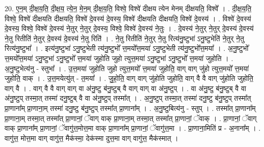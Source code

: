 \documentclass[17pt]{extarticle}
\begin{document}
20. ए॒न॒म् दी॒क्ष॒य॒ति॒ दी॒क्ष॒य॒ त्ये॒न॒ मे॒न॒म् दी॒क्ष॒य॒ति॒ विश्वे॒ विश्वे॑ दीक्षय त्येन मेनम् दीक्षयति॒ विश्वे᳚ । . दी॒क्ष॒य॒ति॒ विश्वे॒ विश्वे॑ दीक्षयति दीक्षयति॒ विश्वे॑ दे॒वस्य॑ दे॒वस्य॒ विश्वे॑ दीक्षयति दीक्षयति॒ विश्वे॑ दे॒वस्य॑ । . विश्वे॑ दे॒वस्य॑ दे॒वस्य॒ विश्वे॒ विश्वे॑ दे॒वस्य॑ ने॒तुर् ने॒तुर् दे॒वस्य॒ विश्वे॒ विश्वे॑ दे॒वस्य॑ ने॒तुः । . दे॒वस्य॑ ने॒तुर् ने॒तुर् दे॒वस्य॑ दे॒वस्य॑ ने॒तु रितीति॑ ने॒तुर् दे॒वस्य॑ दे॒वस्य॑ ने॒तु रिति॑ । . ने॒तु रितीति॑ ने॒तुर् ने॒तु रित्य॑नु॒ष्टुभा॑ ऽनु॒ष्टुभेति॑ ने॒तुर् ने॒तु रित्य॑नु॒ष्टुभा᳚ । . इत्य॑नु॒ष्टुभा॑ ऽनु॒ष्टुभेती त्य॑नु॒ष्टुभो᳚ त्त॒मयो᳚त्त॒मया॑ ऽनु॒ष्टुभेती त्य॑नु॒ष्टुभो᳚त्त॒मया᳚ । . अ॒नु॒ष्टुभो᳚ त्त॒मयो᳚त्त॒मया॑ ऽनु॒ष्टुभा॑ ऽनु॒ष्टुभो᳚ त्त॒मया॑ जुहोति जुहो त्युत्त॒मया॑ ऽनु॒ष्टुभा॑ ऽनु॒ष्टुभो᳚ त्त॒मया॑ जुहोति । . अ॒नु॒ष्टुभेत्य॑नु - स्तुभा᳚ । . उ॒त्त॒मया॑ जुहोति जुहो त्युत्त॒मयो᳚ त्त॒मया॑ जुहोति॒ वाग् वाग् जु॑हो त्युत्त॒मयो᳚ त्त॒मया॑ जुहोति॒ वाक् । . उ॒त्त॒मयेत्यु॑त् - त॒मया᳚ । . जु॒हो॒ति॒ वाग् वाग् जु॑होति जुहोति॒ वाग् वै वै वाग् जु॑होति जुहोति॒ वाग् वै । . वाग् वै वै वाग् वाग् वा अ॑नु॒ष्टु ब॑नु॒ष्टुब् वै वाग् वाग् वा अ॑नु॒ष्टुप् । . वा अ॑नु॒ष्टु ब॑नु॒ष्टुब् वै वा अ॑नु॒ष्टुप् तस्मा॒त् तस्मा॑ दनु॒ष्टुब् वै वा अ॑नु॒ष्टुप् तस्मा᳚त् । . अ॒नु॒ष्टुप् तस्मा॒त् तस्मा॑ दनु॒ष्टु ब॑नु॒ष्टुप् तस्मा᳚त् प्रा॒णाना᳚म् प्रा॒णाना॒म् तस्मा॑ दनु॒ष्टु ब॑नु॒ष्टुप् तस्मा᳚त् प्रा॒णाना᳚म् । . अ॒नु॒ष्टुबित्य॑नु - स्तुप् । . तस्मा᳚त् प्रा॒णाना᳚म् प्रा॒णाना॒म् तस्मा॒त् तस्मा᳚त् प्रा॒णानां॒ ॅवाग् वाक् प्रा॒णाना॒म् तस्मा॒त् तस्मा᳚त् प्रा॒णानां॒ ॅवाक् । . प्रा॒णानां॒ ॅवाग् वाक् प्रा॒णाना᳚म् प्रा॒णानां॒ ॅवागु॑त्त॒मोत्त॒मा वाक् प्रा॒णाना᳚म् प्रा॒णानां॒ ॅवागु॑त्त॒मा । . प्रा॒णाना॒मिति॑ प्र - अ॒नाना᳚म् । . वागु॑त्त॒ मोत्त॒मा वाग् वागु॑त्त॒ मैक॑स्मा॒ देक॑स्मा दुत्त॒मा वाग् वागु॑त्त॒ मैक॑स्मात् । \newline
\end{document}
